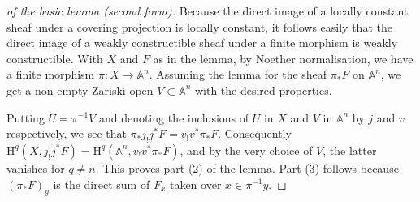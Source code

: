 \documentclass[10pt,twoside]{article}
\newcommand{\homology}{{\mathrm {H}}}
\newcommand{\A}{{\mathbb {A}}}
\newtheorem{proof}{Proof}
\begin{document}
\begin{proof}[of the basic lemma (second form)]
Because the direct image of a locally
constant sheaf under a covering projection is locally constant,
it follows easily that the direct image of a weakly
constructible sheaf under a finite morphism is weakly 
constructible.   
With $X$ and $F$ as in the lemma, by Noether normalisation,
we have a finite morphism  $\pi:X\to \A^n$. Assuming the lemma
for the sheaf $\pi_*F$ on $\A^n$, we get a non-empty 
Zariski open $V\subset \A^n$ with the desired properties.

Putting $U=\pi^{-1}V$ and denoting the inclusions of $U$ 
in $X$ and $V$
in $\A^n$ by $j$ and $v$ respectively, we see that
$\pi_*j_!j^*F=v_!v^*\pi_*F$. Consequently 
 $\homology^q(X,j_!j^*F)=\homology^q(\A^n,v_!v^*\pi_*F )$,
and by the very choice of $V$, the latter vanishes for
 $q \neq n$. This proves part (2) of the lemma. 
Part (3) follows because $(\pi_*F)_y$
is the direct sum of $F_x$ taken over $x \in \pi^{-1}y$.


\end{proof}
\end{document}

